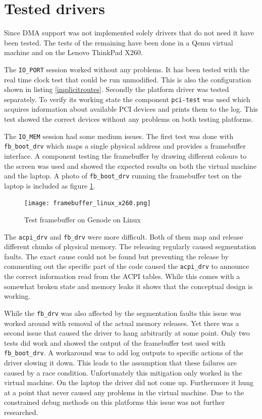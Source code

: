 \documentclass[
a4paper,
11pt,
twoside
]{report}
\begin{document}
		\section{Tested drivers}
		
		Since DMA support was not implemented solely drivers that do not need it have been tested.
		The tests of the remaining have been done in a Qemu virtual machine and on the Lenovo ThinkPad X260.
		
		The \texttt{IO\_PORT} session worked without any problems.
		It has been tested with the real time clock test that could be run unmodified.
		This is also the configuration shown in listing \ref{implicitroutes}.
		Secondly the platform driver was tested separately.
		To verify its working state the component \texttt{pci-test} was used which acquires information about available PCI devices and prints them to the log.
		This test showed the correct devices without any problems on both testing platforms.
		
		The \texttt{IO\_MEM} session had some medium issues.
		The first test was done with \texttt{fb\_boot\_drv} which maps a single physical address and provides a framebuffer interface.
		A component testing the framebuffer by drawing different colours to the screen was used and showed the expected results on both the virtual machine and the laptop.
		A photo of \texttt{fb\_boot\_drv} running the framebuffer test on the laptop is included as figure \ref{testfbx260}.

		\begin{figure}
			\centering
			\texttt{[image: framebuffer\_linux\_x260.png]}
			\caption{Test framebuffer on Genode on Linux}
			\label{testfbx260}
		\end{figure}		
		
		The \texttt{acpi\_drv} and \texttt{fb\_drv} were more difficult.
		Both of them map and release different chunks of physical memory.
		The releasing regularly caused segmentation faults.
		The exact cause could not be found but preventing the release by commenting out the specific part of the code caused the \texttt{acpi\_drv} to announce the correct information read from the ACPI tables.
		While this comes with a somewhat broken state and memory leaks it shows that the conceptual design is working.
		
		While the \texttt{fb\_drv} was also affected by the segmentation faults this issue was worked around with removal of the actual memory releases.
		Yet there was a second issue that caused the driver to hang arbitrarily at some point.
		Only two tests did work and showed the output of the framebuffer test used with \texttt{fb\_boot\_drv}.
		A workaround was to add log outputs to specific actions of the driver slowing it down.
		This leads to the assumption that these failures are caused by a race condition.
		Unfortunately this mitigation only worked in the virtual machine.
		On the laptop the driver did not come up.
		Furthermore it hung at a point that never caused any problems in the virtual machine.
		Due to the constrained debug methods on this platforms this issue was not further researched.
		
\end{document}
